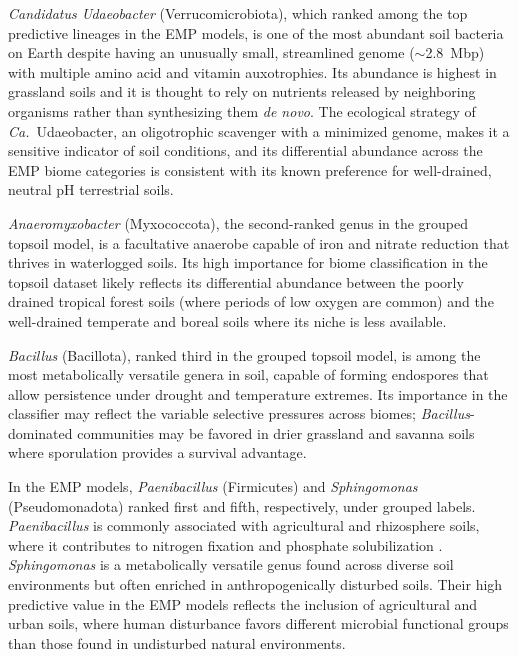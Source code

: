 \documentclass[12pt, oneside]{report}
\begin{document}
\textit{Candidatus Udaeobacter} (Verrucomicrobiota), which ranked among the top predictive
lineages in the EMP models, is one of the most abundant soil bacteria on Earth despite
having an unusually small, streamlined genome (${\sim}$2.8~Mbp) with multiple amino acid
and vitamin auxotrophies\cite{brewer2017}. Its abundance is highest
in grassland soils and it is thought to rely on nutrients released by neighboring organisms
rather than synthesizing them \textit{de novo}\cite{willms2020}. The
ecological strategy of \textit{Ca.}\ Udaeobacter, an oligotrophic scavenger with a
minimized genome, makes it a sensitive indicator of soil conditions, and its differential
abundance across the EMP biome categories is consistent with its known preference for
well-drained, neutral pH terrestrial soils.

\textit{Anaeromyxobacter} (Myxococcota), the second-ranked genus in the grouped topsoil
model, is a facultative anaerobe capable of iron and nitrate reduction that thrives in
waterlogged soils\cite{treude2003,thomas2008}.
Its high importance for biome classification in the topsoil dataset likely reflects its
differential abundance between the poorly drained tropical forest soils (where periods
of low oxygen are common) and the well-drained temperate and boreal soils where its niche
is less available.

\textit{Bacillus} (Bacillota), ranked third in the grouped topsoil model, is among the
most metabolically versatile genera in soil, capable of forming endospores that allow
persistence under drought and temperature extremes\cite{nicholson2002}.
Its importance in the classifier may reflect the variable selective pressures across biomes; \textit{Bacillus}-dominated communities may be favored in drier grassland and savanna
soils where sporulation provides a survival advantage.

In the EMP models, \textit{Paenibacillus} (Firmicutes) and \textit{Sphingomonas}
(Pseudomonadota) ranked first and fifth, respectively, under grouped labels.
\textit{Paenibacillus} is commonly associated with agricultural and rhizosphere soils,
where it contributes to nitrogen fixation and phosphate solubilization
\cite{grady2016}. \textit{Sphingomonas} is a metabolically versatile
genus found across diverse soil environments but often enriched in anthropogenically
disturbed soils\cite{asaf2020}. Their high predictive value in the EMP models reflects the inclusion of agricultural and urban soils, where human disturbance favors different microbial functional groups than those found in undisturbed natural environments.
\end{document}
